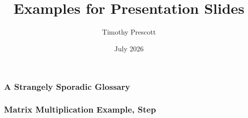 \documentclass{ltx-talk}
\title{Examples for Presentation Slides}
\author{Timothy Prescott}
\date{July 2026}
\begin{document}
\newlength\mylabelwidth
\setlength{}
\begin{frame}
 \frametitle{A Strangely Sporadic Glossary}

\end{frame}

\begin{frame}[tag-slides=1-]
\frametitle{Matrix Multiplication Example,
 Step }

\end{frame}

\end{document}
